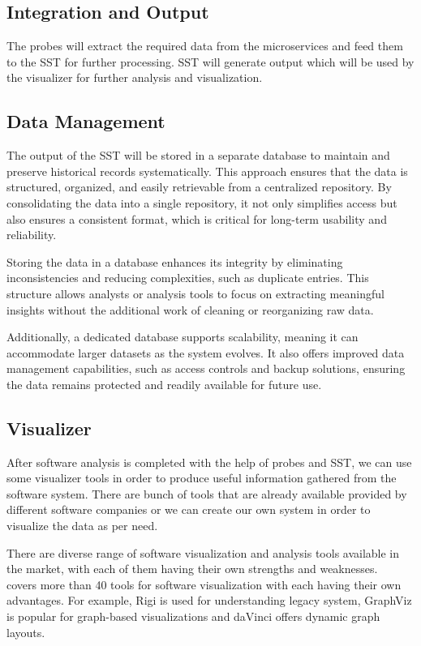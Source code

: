\subsection{Integration and Output}

The probes will extract the required data from the microservices and feed them to the SST for further processing. SST will generate output which will be used by the visualizer for further analysis and visualization.

\subsection{Data Management}

The output of the SST will be stored in a separate database to maintain and preserve historical records systematically. This approach ensures that the data is structured, organized, and easily retrievable from a centralized repository. By consolidating the data into a single repository, it not only simplifies access but also ensures a consistent format, which is critical for long-term usability and reliability. 

Storing the data in a database enhances its integrity by eliminating inconsistencies and reducing complexities, such as duplicate entries. This structure allows analysts or analysis tools to focus on extracting meaningful insights without the additional work of cleaning or reorganizing raw data.

Additionally, a dedicated database supports scalability, meaning it can accommodate larger datasets as the system evolves. It also offers improved data management capabilities, such as access controls and backup solutions, ensuring the data remains protected and readily available for future use.

\subsection{Visualizer}\label{sec:component-visualizer}

After software analysis is completed with the help of probes and SST, we can use some visualizer tools in order to produce useful information gathered from the software system. There are bunch of tools that are already available provided by different software companies or we can create our own system in order to visualize the data as per need. 

There are diverse range of software visualization and analysis tools available in the market, with each of them having their own strengths and weaknesses.~\citep{SWVizTools2001} covers more than 40 tools for software visualization with each having their own advantages. For example, Rigi is used for understanding legacy system, GraphViz is popular for graph-based visualizations and daVinci offers dynamic graph layouts.

